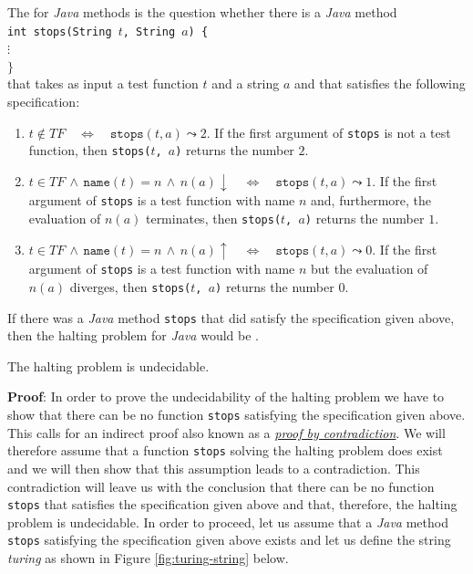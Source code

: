 \noindent
The   for \textsl{Java} methods is the question whether there is a
\textsl{Java} method \\[0.2cm]
\hspace*{1.3cm} \texttt{int stops(String $t$, String $a$) \{ } \\
\hspace*{2.3cm} $\vdots$ \\
\hspace*{1.3cm} $\}$
\\[0.2cm] 
that takes as input a test function $t$ and a string $a$ and that satisfies the following specification:
\begin{enumerate}
\item $t \not\in T\!F \quad\Leftrightarrow\quad \mathtt{stops}(t, a) \leadsto 2$.
If the first argument of \texttt{stops} is not a test function, then 
      \texttt{stops($t$, $a$)} returns the number $2$.
\item $t \in T\!F \,\wedge\, \mathtt{name}(t) = n \,\wedge\, n(a)\downarrow \quad\Leftrightarrow\quad
       \mathtt{stops}(t, a) \leadsto 1$.
If the first argument of \texttt{stops} is a test function with name $n$ and, furthermore,
      the evaluation of $n(a)$ terminates, then \texttt{stops($t$, $a$)} returns the number $1$.
\item $t \in T\!F \,\wedge\, \mathtt{name}(t) = n \,\wedge\, n(a)\uparrow \quad\Leftrightarrow\quad
       \mathtt{stops}(t, a) \leadsto 0$.
If the first argument of \texttt{stops} is a test function with name $n$ but the evaluation of $n(a)$ 
      diverges, then 
      \texttt{stops($t$, $a$)} returns the number $0$.
\end{enumerate}
If there was a \textsl{Java} method \texttt{stops} that did satisfy the specification given above,
then the halting problem for \textsl{Java} would be .

\begin{Theorem}
  The halting problem is undecidable.
\end{Theorem}

\noindent
\textbf{Proof}:  In order to prove the undecidability of the halting problem we have to show that
there can be no function \texttt{stops} satisfying the specification given above.
This calls for an
indirect proof also known as a \href{http://en.wikipedia.org/wiki/Indirect_proof}{\emph{proof by contradiction}}.
We will therefore assume that a function \texttt{stops} solving the halting problem does
exist and we will then show that this assumption leads to a contradiction.
This contradiction will
leave us with the conclusion that there can be no function \texttt{stops} that satisfies
the specification given above and that, therefore, the halting problem is undecidable.
In order to proceed, let us assume that a \textsl{Java} method \texttt{stops}
satisfying the specification given above exists and let us define the string
\textsl{turing} as shown in Figure \ref{fig:turing-string} below.

